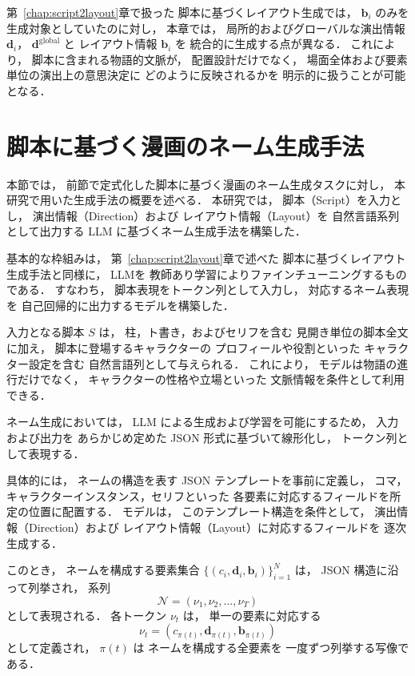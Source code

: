 \documentclass[a4j,12pt,dvipdfmx]{jsreport}
\begin{document}
第~\ref{chap:script2layout}章で扱った
脚本に基づくレイアウト生成では，
$\mathbf{b}_i$ のみを生成対象としていたのに対し，
本章では，
局所的およびグローバルな演出情報 $\mathbf{d}_i$，
$\mathbf{d}^{\mathrm{global}}$ と
レイアウト情報 $\mathbf{b}_i$ を
統合的に生成する点が異なる．
これにより，
脚本に含まれる物語的文脈が，
配置設計だけでなく，
場面全体および要素単位の演出上の意思決定に
どのように反映されるかを
明示的に扱うことが可能となる．

\section{脚本に基づく漫画のネーム生成手法}
\label{sec:script2name_method}

本節では，
前節で定式化した脚本に基づく漫画のネーム生成タスクに対し，
本研究で用いた生成手法の概要を述べる．
本研究では，
脚本（Script）を入力とし，
演出情報（Direction）および
レイアウト情報（Layout）を
自然言語系列として出力する
LLM に基づくネーム生成手法を構築した．

基本的な枠組みは，
第~\ref{chap:script2layout}章で述べた
脚本に基づくレイアウト生成手法と同様に，
LLMを
教師あり学習によりファインチューニングするものである．
すなわち，
脚本表現をトークン列として入力し，
対応するネーム表現を
自己回帰的に出力するモデルを構築した．

入力となる脚本 $S$ は，
柱，ト書き，およびセリフを含む
見開き単位の脚本全文に加え，
脚本に登場するキャラクターの
プロフィールや役割といった
キャラクター設定を含む
自然言語列として与えられる．
これにより，
モデルは物語の進行だけでなく，
キャラクターの性格や立場といった
文脈情報を条件として利用できる．

ネーム生成においては，
LLM による生成および学習を可能にするため，
入力および出力を
あらかじめ定めた JSON 形式に基づいて線形化し，
トークン列として表現する．

具体的には，
ネームの構造を表す JSON テンプレートを事前に定義し，
コマ，キャラクターインスタンス，セリフといった
各要素に対応するフィールドを所定の位置に配置する．
モデルは，
このテンプレート構造を条件として，
演出情報（Direction）および
レイアウト情報（Layout）に対応するフィールドを
逐次生成する．

このとき，
ネームを構成する要素集合
$\{(c_i, \mathbf{d}_i, \mathbf{b}_i)\}_{i=1}^{N}$ は，
JSON 構造に沿って列挙され，
系列
\begin{equation}
   \mathcal{N} = (\nu_1, \nu_2, \dots, \nu_T)
\end{equation}
として表現される．
各トークン $\nu_t$ は，
単一の要素に対応する
\begin{equation}
   \nu_t = (c_{\pi(t)}, \mathbf{d}_{\pi(t)}, \mathbf{b}_{\pi(t)})
\end{equation}
として定義され，
$\pi(t)$ は
ネームを構成する全要素を
一度ずつ列挙する写像である．
\end{document}
